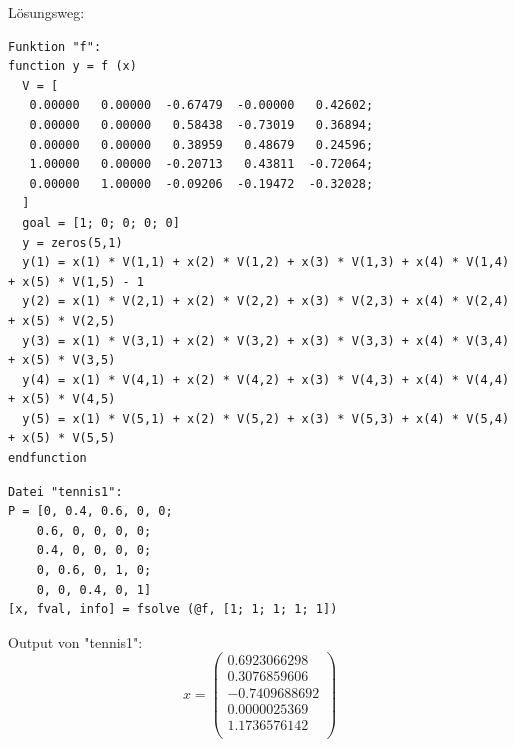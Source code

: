 \documentclass{article}
\begin{document}
Lösungsweg: \\
\vspace{5mm}
\footnotesize{
\begin{lstlisting}
Funktion "f": 
function y = f (x) 
  V = [ 
   0.00000   0.00000  -0.67479  -0.00000   0.42602; 
   0.00000   0.00000   0.58438  -0.73019   0.36894; 
   0.00000   0.00000   0.38959   0.48679   0.24596; 
   1.00000   0.00000  -0.20713   0.43811  -0.72064; 
   0.00000   1.00000  -0.09206  -0.19472  -0.32028; 
  ] 
  goal = [1; 0; 0; 0; 0] 
  y = zeros(5,1) 
  y(1) = x(1) * V(1,1) + x(2) * V(1,2) + x(3) * V(1,3) + x(4) * V(1,4) + x(5) * V(1,5) - 1 
  y(2) = x(1) * V(2,1) + x(2) * V(2,2) + x(3) * V(2,3) + x(4) * V(2,4) + x(5) * V(2,5) 
  y(3) = x(1) * V(3,1) + x(2) * V(3,2) + x(3) * V(3,3) + x(4) * V(3,4) + x(5) * V(3,5) 
  y(4) = x(1) * V(4,1) + x(2) * V(4,2) + x(3) * V(4,3) + x(4) * V(4,4) + x(5) * V(4,5) 
  y(5) = x(1) * V(5,1) + x(2) * V(5,2) + x(3) * V(5,3) + x(4) * V(5,4) + x(5) * V(5,5) 
endfunction
\end{lstlisting}
}
\begin{lstlisting}
Datei "tennis1": 
P = [0, 0.4, 0.6, 0, 0; 
    0.6, 0, 0, 0, 0; 
    0.4, 0, 0, 0, 0; 
    0, 0.6, 0, 1, 0; 
    0, 0, 0.4, 0, 1] 
[x, fval, info] = fsolve (@f, [1; 1; 1; 1; 1]) 
\end{lstlisting}
\vspace{5mm}
\normalsize
Output von "tennis1":
\[
x=
  \begin{pmatrix}
    0.6923066298 \\
    0.3076859606 \\
    -0.7409688692 \\
    0.0000025369 \\
    1.1736576142 \\
    
  \end{pmatrix}
\]

\subsubsection{}
\end{document}

